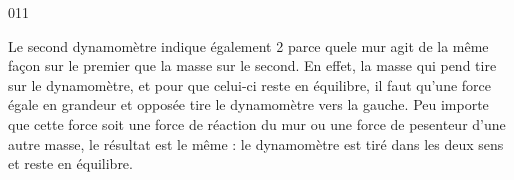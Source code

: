 

\begin{corrige}{011}

Le second dynamomètre indique également \unit{2}{\newton} parce quele mur agit de la même façon sur le premier que la masse sur le second. En effet, la masse qui pend tire sur le dynamomètre, et pour que celui-ci reste en équilibre, il faut qu'une force égale en grandeur et opposée tire le dynamomètre vers la gauche. Peu importe que cette force soit une force de réaction du mur ou une force de pesenteur d'une autre masse, le résultat est le même : le dynamomètre est tiré dans les deux sens et reste en équilibre.
\end{corrige}
